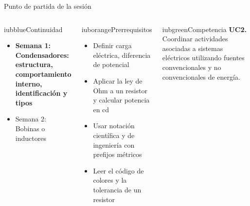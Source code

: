 \documentclass[aspectratio=169,11pt,xcolor={table}]{beamer}
\begin{document}
\begin{frame}{Punto de partida de la sesión}
\begin{columns}[T,onlytextwidth]
\begin{caja}[height=5.9cm]{iubblue}{Continuidad}
\scriptsize \begin{itemize}\setlength{\itemsep}{2pt}
  \item \textbf{Semana 1: Condensadores: estructura, comportamiento interno, identificación y tipos}
  \item Semana 2: Bobinas o inductores
\end{itemize}
\end{caja}
\begin{caja}[height=5.9cm]{iuborange}{Prerrequisitos}
\scriptsize \begin{itemize}\setlength{\itemsep}{2pt}
  \item Definir carga eléctrica, diferencia de potencial
  \item Aplicar la ley de Ohm a un resistor y calcular potencia en cd
  \item Usar notación científica y de ingeniería con prefijos métricos
  \item Leer el código de colores y la tolerancia de un resistor
\end{itemize}
\end{caja}
\begin{caja}[height=5.9cm]{iubgreen}{Competencia}
\scriptsize \textbf{UC2.} Coordinar actividades asociadas a sistemas eléctricos utilizando fuentes convencionales y no convencionales de energía.
\end{caja}
\end{columns}
\end{frame}
\end{document}
